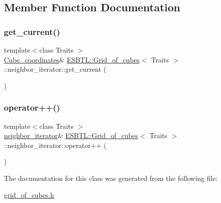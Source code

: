 \subsection{Member Function Documentation}
\mbox{\label{classESBTL_1_1Grid__of__cubes_1_1neighbor__iterator_ac5e74d1983825788f0e80892b96c3517}} 
\subsubsection{\texorpdfstring{get\+\_\+current()}{get\_current()}}
{\footnotesize\ttfamily template$<$class Traits $>$ \\
\hyperlink{structESBTL_1_1Grid__of__cubes_ad55c84346bab961e08d95e494551d07d}{Cube\+\_\+coordinates}\& \hyperlink{structESBTL_1_1Grid__of__cubes}{E\+S\+B\+T\+L\+::\+Grid\+\_\+of\+\_\+cubes}$<$ Traits $>$\+::neighbor\+\_\+iterator\+::get\+\_\+current (\begin{DoxyParamCaption}{ }\end{DoxyParamCaption})\hspace{0.3cm}{\ttfamily [inline]}}

\mbox{\label{classESBTL_1_1Grid__of__cubes_1_1neighbor__iterator_a18641650d9d12e66224817deee861bc1}} 
\subsubsection{\texorpdfstring{operator++()}{operator++()}}
{\footnotesize\ttfamily template$<$class Traits $>$ \\
\hyperlink{classESBTL_1_1Grid__of__cubes_1_1neighbor__iterator}{neighbor\+\_\+iterator}\& \hyperlink{structESBTL_1_1Grid__of__cubes}{E\+S\+B\+T\+L\+::\+Grid\+\_\+of\+\_\+cubes}$<$ Traits $>$\+::neighbor\+\_\+iterator\+::operator++ (\begin{DoxyParamCaption}{ }\end{DoxyParamCaption})\hspace{0.3cm}{\ttfamily [inline]}}



The documentation for this class was generated from the following file\+:\begin{DoxyCompactItemize}
\item 
\hyperlink{grid__of__cubes_8h}{grid\+\_\+of\+\_\+cubes.\+h}\end{DoxyCompactItemize}
